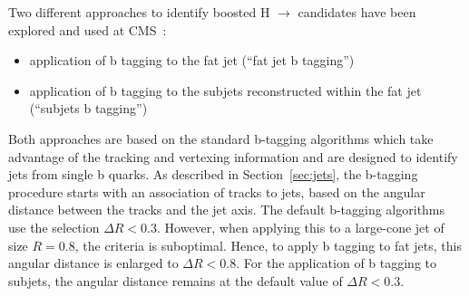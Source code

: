 Two different approaches to identify boosted H $\to$ \bbbar candidates have been explored
and used at CMS~\cite{CMS:BTV13001}:

\begin{itemize}
\item application of b tagging to the fat jet (``fat jet b tagging'')
\item application of b tagging to the subjets reconstructed within the fat jet (``subjets b tagging'')
\end{itemize}

Both approaches are based on the standard b-tagging algorithms which take advantage of the tracking and vertexing information and are designed to identify jets from single b quarks.
As described in Section~\ref{sec:jets}, the b-tagging procedure starts with an association of tracks to jets, based on the angular distance between the tracks and the jet axis. 
The default b-tagging algorithms use the selection $\Delta R < 0.3$.  However, when applying this to a large-cone jet of size $R = 0.8$, 
the criteria is suboptimal. Hence, to apply b tagging to fat jets, this angular distance is enlarged to $\Delta R < 0.8$. 
For the application of b tagging to subjets, the angular distance remains at the default value of $\Delta R < 0.3$.\\

